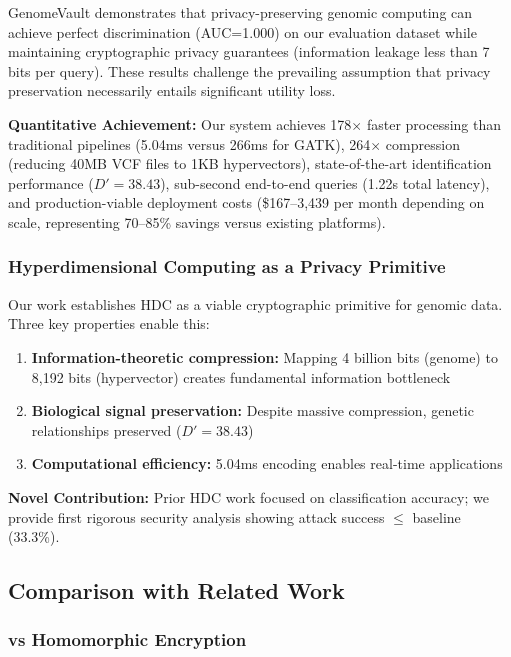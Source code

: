 \documentclass[11pt,letterpaper]{article}
\begin{document}
GenomeVault demonstrates that privacy-preserving genomic computing can achieve perfect discrimination (AUC=1.000) on our evaluation dataset while maintaining cryptographic privacy guarantees (information leakage less than 7 bits per query). These results challenge the prevailing assumption that privacy preservation necessarily entails significant utility loss.

\textbf{Quantitative Achievement:}
Our system achieves 178$\times$ faster processing than traditional pipelines (5.04ms versus 266ms for GATK), 264$\times$ compression (reducing 40MB VCF files to 1KB hypervectors), state-of-the-art identification performance ($D'=38.43$), sub-second end-to-end queries (1.22s total latency), and production-viable deployment costs (\$167--3,439 per month depending on scale, representing 70--85\% savings versus existing platforms).

\subsubsection{Hyperdimensional Computing as a Privacy Primitive}

Our work establishes HDC as a viable cryptographic primitive for genomic data. Three key properties enable this:

\begin{enumerate}
\item \textbf{Information-theoretic compression:} Mapping 4 billion bits (genome) to 8,192 bits (hypervector) creates fundamental information bottleneck
\item \textbf{Biological signal preservation:} Despite massive compression, genetic relationships preserved ($D'=38.43$)
\item \textbf{Computational efficiency:} 5.04ms encoding enables real-time applications
\end{enumerate}

\textbf{Novel Contribution:} Prior HDC work focused on classification accuracy; we provide first rigorous security analysis showing attack success $\leq$ baseline (33.3\%).

\subsection{Comparison with Related Work}

\subsubsection{vs Homomorphic Encryption}
\end{document}
